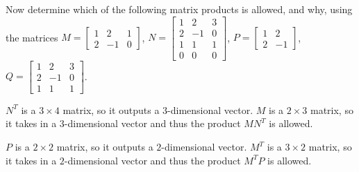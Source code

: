 \documentclass{ximera}
\begin{document}
\begin{exploration}
\begin{example}

        Now determine which of the following matrix products is allowed, and why, using the matrices %
        $M=\begin{bmatrix} 1 & 2 & 1\\ 2&-1 &0\end{bmatrix}$, $N=\begin{bmatrix} 1 & 2 & 3 \\ 2&-1 & 0 \\ 1 & 1 & 1 \\ 0 & 0 & 0\end{bmatrix}$, $P=\begin{bmatrix} 1 & 2 \\ 2&-1 \end{bmatrix}$, $Q=\begin{bmatrix} 1 & 2 & 3 \\ 2&-1 & 0 \\ 1 & 1 & 1\end{bmatrix}$.


        \begin{selectAll}


        \end{selectAll}

        \begin{solution}
        
            $N^T$ is a $3\times 4$ matrix, so it outputs a $3$-dimensional vector. $M$ is a $2\times 3$ matrix, so it takes in a $3$-dimensional vector and thus the product $MN^T$ is allowed.

            $P$ is a $2\times 2$ matrix, so it outputs a $2$-dimensional vector. $M^T$ is a $3\times 2$ matrix, so it takes in a $2$-dimensional vector and thus the product $M^TP$ is allowed.


\end{solution}
\end{example}
\end{exploration}
\end{document}
